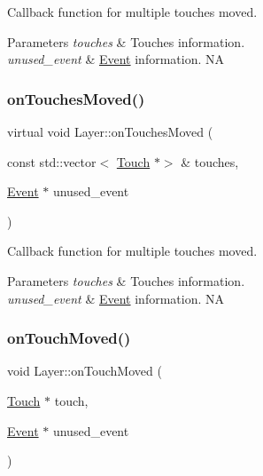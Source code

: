Callback function for multiple touches moved.


\begin{DoxyParams}{Parameters}
{\em touches} & Touches information. \\
\hline
{\em unused\+\_\+event} & \hyperlink{classEvent}{Event} information.  NA \\
\hline
\end{DoxyParams}
\mbox{\label{classLayer_aab61c8121d4765a5956c8348e0bd49d9}} 
\subsubsection{\texorpdfstring{on\+Touches\+Moved()}{onTouchesMoved()}\hspace{0.1cm}{\footnotesize\ttfamily [2/2]}}
{\footnotesize\ttfamily virtual void Layer\+::on\+Touches\+Moved (\begin{DoxyParamCaption}\item[{const std\+::vector$<$ \hyperlink{classTouch}{Touch} $\ast$$>$ \&}]{touches,  }\item[{\hyperlink{classEvent}{Event} $\ast$}]{unused\+\_\+event }\end{DoxyParamCaption})\hspace{0.3cm}{\ttfamily [virtual]}}

Callback function for multiple touches moved.


\begin{DoxyParams}{Parameters}
{\em touches} & Touches information. \\
\hline
{\em unused\+\_\+event} & \hyperlink{classEvent}{Event} information.  NA \\
\hline
\end{DoxyParams}
\mbox{\label{classLayer_ad614a7a347f171cd6185e7aeef125047}} 
\subsubsection{\texorpdfstring{on\+Touch\+Moved()}{onTouchMoved()}\hspace{0.1cm}{\footnotesize\ttfamily [1/2]}}
{\footnotesize\ttfamily void Layer\+::on\+Touch\+Moved (\begin{DoxyParamCaption}\item[{\hyperlink{classTouch}{Touch} $\ast$}]{touch,  }\item[{\hyperlink{classEvent}{Event} $\ast$}]{unused\+\_\+event }\end{DoxyParamCaption})\hspace{0.3cm}{\ttfamily [virtual]}}

